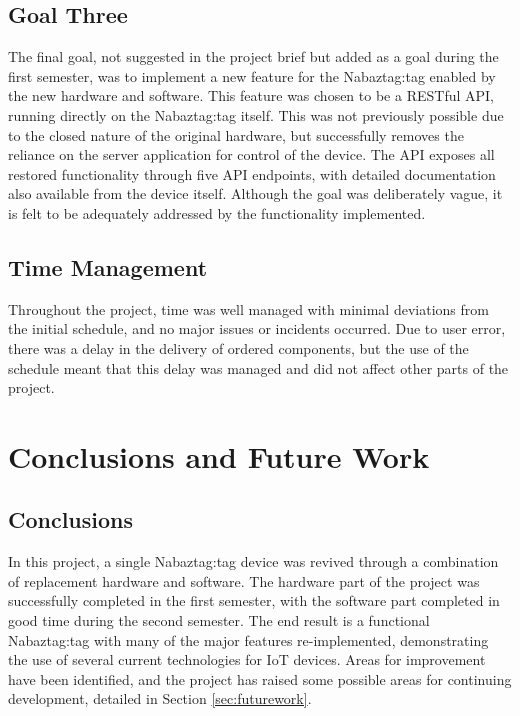 \documentclass[12pt, a4paper]{article}
\begin{document}
	\subsection{Goal Three}
	The final goal, not suggested in the project brief but added as a goal during the first semester, was to implement a new feature for the Nabaztag:tag enabled by the new hardware and software. This feature was chosen to be a \ac{REST}ful \ac{API}, running directly on the Nabaztag:tag itself. This was not previously possible due to the closed nature of the original hardware, but successfully removes the reliance on the server application for control of the device. The \ac{API} exposes all restored functionality through five \ac{API} endpoints, with detailed documentation also available from the device itself. Although the goal was deliberately vague, it is felt to be adequately addressed by the functionality implemented.
	
	\subsection{Time Management}
	
	Throughout the project, time was well managed with minimal deviations from the initial schedule, and no major issues or incidents occurred. Due to user error, there was a delay in the delivery of ordered components, but the use of the schedule meant that this delay was managed and did not affect other parts of the project.
	
	\section{Conclusions and Future Work}
	
	\subsection{Conclusions}
	
		In this project, a single Nabaztag:tag device was revived through a combination of replacement hardware and software. The hardware part of the project was successfully completed in the first semester, with the software part completed in good time during the second semester. The end result is a functional Nabaztag:tag with many of the major features re-implemented, demonstrating the use of several current technologies for \ac{IoT} devices. Areas for improvement have been identified, and the project has raised some possible areas for continuing development, detailed in Section \ref{sec:futurework}.
		
\end{document}
